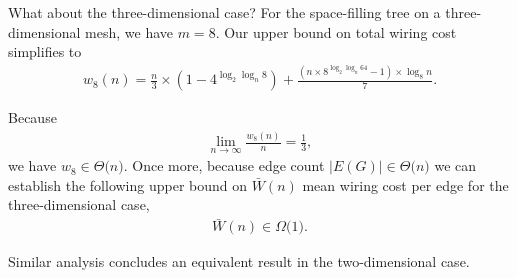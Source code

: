 What about the three-dimensional case?
For the space-filling tree on a three-dimensional mesh, we have $m = 8$.
Our upper bound on total wiring cost simplifies to
\begin{align*}
w_8(n) =
\frac{n}{3}
\times (1 - 4^{ \log_2 \log_n 8 })
+
\frac{
  (
    n \times 8^{
      \log_2 \log_n 64
    } - 1
  ) \times \log_8 n
}{7}.
\end{align*}

Because
\begin{align*}
\lim_{n \rightarrow \infty}
\frac{
  w_8(n)
}{
  n
}
= \frac{1}{3},
\end{align*}
we have $w_8 \in \Theta \Big( n \Big)$.
Once more, because edge count $|E(G)| \in \Theta \Big( n \Big)$ we can establish the following upper bound on $\bar{W}(n)$ mean wiring cost per edge for the three-dimensional case,
\begin{align*}
\bar{W}(n) \in \Omega \Big( 1 \Big).
\end{align*}

%

Similar analysis concludes an equivalent result in the two-dimensional case.

%
%
